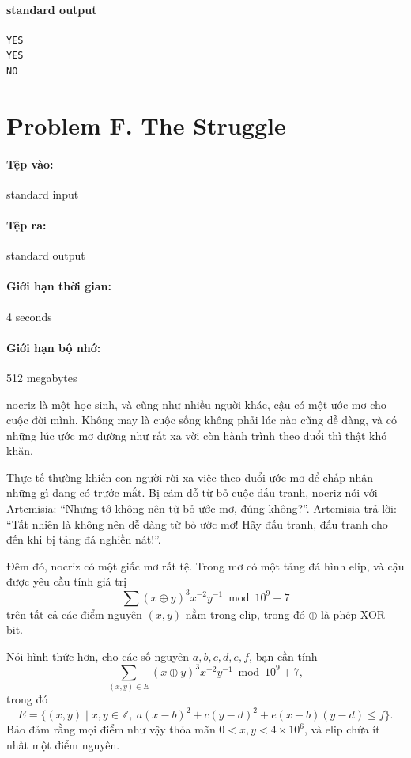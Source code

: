 \documentclass[11pt]{article}
\begin{document}
\paragraph{standard output}
\begin{verbatim}
YES
YES
NO
\end{verbatim}

\section{Problem F. The Struggle}

\paragraph{Tệp vào:} standard input
\paragraph{Tệp ra:} standard output
\paragraph{Giới hạn thời gian:} 4 seconds
\paragraph{Giới hạn bộ nhớ:} 512 megabytes

nocriz là một học sinh, và cũng như nhiều người khác, cậu có một ước mơ cho
cuộc đời mình. Không may là cuộc sống không phải lúc nào cũng dễ dàng, và có
những lúc ước mơ dường như rất xa vời còn hành trình theo đuổi thì thật khó
khăn.

Thực tế thường khiến con người rời xa việc theo đuổi ước mơ để chấp nhận
những gì đang có trước mắt. Bị cám dỗ từ bỏ cuộc đấu tranh, nocriz nói với
Artemisia: ``Nhưng tớ không nên từ bỏ ước mơ, đúng không?''. Artemisia trả
lời: ``Tất nhiên là không nên dễ dàng từ bỏ ước mơ! Hãy đấu tranh, đấu tranh
cho đến khi bị tảng đá nghiền nát!''.

Đêm đó, nocriz có một giấc mơ rất tệ. Trong mơ có một tảng đá hình elip, và
cậu được yêu cầu tính giá trị
\[
  \sum (x\oplus y)^3 x^{-2}y^{-1}\bmod 10^9+7
\]
trên tất cả các điểm nguyên \((x,y)\) nằm trong elip, trong đó \(\oplus\) là
phép XOR bit.

Nói hình thức hơn, cho các số nguyên \(a,b,c,d,e,f\), bạn cần tính
\[
  \sum_{(x,y)\in E}(x\oplus y)^3 x^{-2}y^{-1}\bmod 10^9+7,
\]
trong đó
\[
  E=\{(x,y)\mid x,y\in\mathbb{Z},\
  a(x-b)^2+c(y-d)^2+e(x-b)(y-d)\le f\}.
\]
Bảo đảm rằng mọi điểm như vậy thỏa mãn \(0<x,y<4\times 10^6\), và elip chứa
ít nhất một điểm nguyên.
\end{document}
